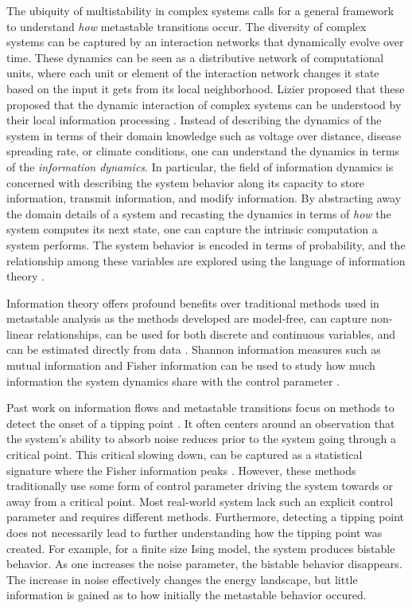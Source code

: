 \documentclass[a4paper, 11pt, twocolumn]{article}
\begin{document}
The ubiquity of multistability  in complex systems calls for
a   general  framework   to   understand  \emph{how}   metastable
transitions occur.  The diversity of complex  systems can be
captured by an interaction  networks that dynamically evolve
over  time. These  dynamics can  be seen  as a  distributive
network of  computational units, where each  unit or element
of the  interaction network  changes it  state based  on the
input it  gets from its local  neighborhood. Lizier proposed
that these proposed that  the dynamic interaction of complex
systems  can  be  understood   by  their  local  information
processing \cite{Lizier2008,Lizier2013,Lizier2018}. Instead of
describing  the dynamics  of the  system in  terms of  their
domain  knowledge such  as  voltage  over distance,  disease
spreading rate,  or climate  conditions, one  can understand
the  dynamics in  terms  of the  \emph{information dynamics}.  In
particular, the  field of information dynamics  is concerned
with describing  the system  behavior along its  capacity to
store   information,   transmit  information,   and   modify
information.  By abstracting  away the  domain details  of a
system  and recasting  the dynamics  in terms  of \emph{how}  the
system  computes  its  next   state,  one  can  capture  the
intrinsic computation a system performs. The system behavior
is  encoded in  terms of  probability, and  the relationship
among  these variables  are explored  using the  language of
information theory \cite{Quax2017}.

Information theory offers profound benefits over traditional
methods used in metastable analysis as the methods developed
are model-free, can capture non-linear relationships, can be
used for both discrete and  continuous variables, and can be
estimated   directly  from   data  \cite{Cover2005}.   Shannon
information measures  such as mutual information  and Fisher
information can  be used to  study how much  information the
system   dynamics   share   with   the   control   parameter
\cite{Nicolis2016,Lizier2010}.

Past work  on information  flows and  metastable transitions
focus  on methods  to detect  the onset  of a  tipping point
\cite{Scheffer2009,Prokopenko2011,Scheffer2001}.    It   often
centers around  an observation that the  system's ability to
absorb noise  reduces prior  to the  system going  through a
critical point. This critical  slowing down, can be captured
as  a statistical  signature  where  the Fisher  information
peaks \cite{Eason2014}.  However, these  methods traditionally
use  some  form  of  control parameter  driving  the  system
towards  or  away from  a  critical  point. Most  real-world
system lack such an  explicit control parameter and requires
different  methods. Furthermore,  detecting a  tipping point
does not  necessarily lead to further  understanding how the
tipping point  was created. For  example, for a  finite size
Ising model,  the system produces bistable  behavior. As one
increases  the   noise  parameter,  the   bistable  behavior
disappears. The  increase in  noise effectively  changes the
energy landscape, but little information is gained as to how
initially the metastable behavior occured.
\end{document}
